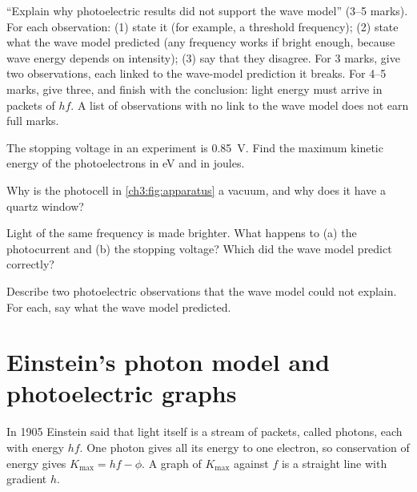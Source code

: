 \begin{examtip}
``Explain why photoelectric results did not support the wave model'' (3--5 marks).
For each observation: (1) state it (for example, a threshold frequency); (2) state
what the wave model predicted (any frequency works if bright enough, because wave
energy depends on intensity); (3) say that they disagree. For 3 marks, give two
observations, each linked to the wave-model prediction it breaks. For 4--5 marks,
give three, and finish with the conclusion: light energy must arrive in packets of
$hf$. A list of observations with no link to the wave model does not earn full
marks.
\end{examtip}

\begin{quickcheck}
  \item The stopping voltage in an experiment is \qty{0.85}{V}. Find the maximum
        kinetic energy of the photoelectrons in eV and in joules.
  \item Why is the photocell in \cref{ch3:fig:apparatus} a vacuum, and why does it
        have a quartz window?
  \item Light of the same frequency is made brighter. What happens to (a) the
        photocurrent and (b) the stopping voltage? Which did the wave model predict
        correctly?
  \item Describe two photoelectric observations that the wave model could not
        explain. For each, say what the wave model predicted.\label{ch3:qc:twoobs}
\end{quickcheck}

\section{Einstein's photon model and photoelectric graphs}\label{ch3:sec:photon}

\begin{bigidea}
In 1905 Einstein said that light itself is a stream of packets, called photons, each
with energy $hf$. One photon gives all its energy to one electron, so conservation
of energy gives $K_\mathrm{max} = hf - \phi$. A graph of $K_\mathrm{max}$ against $f$
is a straight line with gradient $h$.
\end{bigidea}

\begin{keywords}
\end{keywords}

